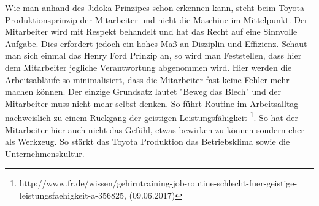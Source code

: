 \documentclass[00_ToyotaProduktionssystem.tex]{subfiles}
\begin{document}
Wie man anhand des Jidoka Prinzipes schon erkennen kann, steht beim Toyota Produktionsprinzip der Mitarbeiter und nicht die Maschine im Mittelpunkt. Der Mitarbeiter wird mit Respekt behandelt und hat das Recht auf eine Sinnvolle Aufgabe. Dies erfordert jedoch ein hohes Maß an Disziplin und Effizienz. Schaut man sich einmal das Henry Ford Prinzip an, so wird man Feststellen, dass hier dem Mitarbeiter jegliche Verantwortung abgenommen wird. Hier werden die Arbeitsabläufe so minimalisiert, dass die Mitarbeiter fast keine Fehler mehr machen können. Der einzige Grundsatz lautet "Beweg das Blech" und der Mitarbeiter muss nicht mehr selbst denken. So führt Routine im Arbeitsalltag nachweislich zu einem Rückgang der geistigen Leistungsfähigkeit \footnote{http://www.fr.de/wissen/gehirntraining-job-routine-schlecht-fuer-geistige-leistungsfaehigkeit-a-356825, (09.06.2017)}. So hat der Mitarbeiter hier auch nicht das Gefühl, etwas bewirken zu können sondern eher als Werkzeug. So stärkt das Toyota Produktion das Betriebsklima sowie die Unternehmenskultur.
\end{document}
